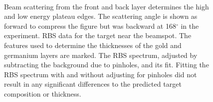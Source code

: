 \begin{figure}[!htbp]
\centering
{}
\\
\caption[Interpreting RBS data and constraining the target thickness.]{ Beam scattering from the front and back layer determines the high and low energy plateau edges.  The scattering angle is shown as forward to compress the figure but was backward at 168$^\circ$ in the experiment.   RBS data for the  target near the beamspot.  The features used to determine the thicknesses of the gold and germanium layers are marked.   The RBS spectrum, adjusted by subtracting the background due to pinholes, and its fit.  Fitting the RBS spectrum with and without adjusting for pinholes did not result in any significant differences to the predicted target composition or thickness.}
\end{figure}
